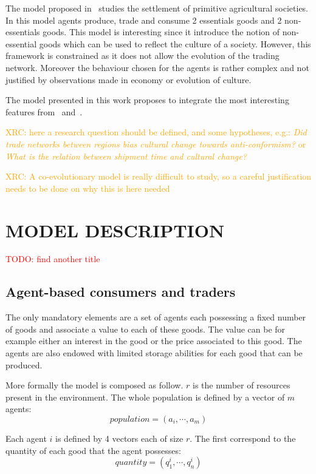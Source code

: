 \documentclass{wscpaperproc}
\newcommand{\memo}[2]{\textcolor{#1}{#2}}
\newcommand{\todo}[1]{\memo{red}{TODO: #1\\}}
\newcommand{\xrc}[1]{\memo{orange}{XRC: #1\\}}
\begin{document}
The model proposed in~\cite{macmillan_agent-based_2008} studies the settlement of primitive agricultural societies. In this model agents produce, trade and consume 2 essentials goods and 2 non-essentials goods. This model is interesting since it introduce the notion of non-essential goods which can be used to reflect the culture of a society. However, this framework is constrained as it does not allow the evolution of the trading network. Moreover the behaviour chosen for the agents is rather complex and not justified by observations made in economy or evolution of culture.

The model presented in this work proposes to integrate the most interesting features from~\cite{bentley_specialisation_2005} and~\cite{macmillan_agent-based_2008}.

\xrc{here a research question should be defined, and some hypotheses, e.g.: \emph{Did trade networks between regions bias cultural change towards anti-conformism?} or \emph{What is the relation between shipment time and cultural change?}}

\xrc{A co-evolutionary model is really difficult to study, so a careful justification needs to be done on why this is here needed}

\section{MODEL DESCRIPTION}

\todo{find another title}
\subsection{Agent-based consumers and traders}

The only mandatory elements are a set of agents each possessing a fixed number of goods and associate a value to each of these goods. The value can be for example either an interest in the good or the price associated to this good. The agents are also endowed with limited storage abilities for each good that can be produced. 


More formally the model is composed as follow. $r$ is the number of resources present in the environment. The whole population is defined by a vector of $m$ agents: 
$$ population = (a_i, \cdots ,a_m) $$
		
Each agent $i$ is defined by 4 vectors each of size $r$. The first correspond to the quantity of each good that the agent possesses: $$ quantity = (q^i_1,\cdots,q^i_n) $$
\end{document}
